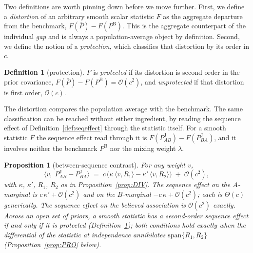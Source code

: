 \documentclass[a4paper,fleqn]{cas-sc}
\newtheorem{proposition}{Proposition}
\theoremstyle{remark}
\theoremstyle{definition}
\newtheorem{definition}{Definition}
\newcommand{\PB}{P^{\mathrm{B}}}
\newcommand{\PJ}{P^{\mathrm{J}}}
\newcommand{\Pbar}{\overline{P}}
\newcommand{\bigO}{\mathcal{O}}
\begin{document}
Two definitions are worth pinning down before we move further. First, we define a \emph{distortion} of an arbitrary smooth scalar statistic $F$ as the aggregate departure from the benchmark, $F(\Pbar)-F(\PB)$. This is the aggregate counterpart of the individual \emph{gap} and is always a population-average object by definition. Second, we define the notion of a \emph{protection}, which classifies that distortion by its order in $c$.

\begin{definition}[protection]\label{def:protection}
$F$ is \emph{protected} if its distortion is second order in the prior covariance,
$F(\Pbar)-F(\PB)=\bigO(c^{2})$, and \emph{unprotected} if that distortion is first order, $\bigO(c)$.
\end{definition}

The distortion compares the population average with the benchmark. The same
classification can be reached without either ingredient, by reading the sequence
effect of Definition~\ref{def:seqeffect} through the statistic itself. For a smooth
statistic $F$ the sequence effect read through it is $F(\PJ_{AB})-F(\PJ_{BA})$, and
it involves neither the benchmark $\PB$ nor the mixing weight $\lambda$.
\par
\renewcommand{\theproposition}{ORD}%
\begin{proposition}[between-sequence contrast]\label{prop:ORD}
For any weight $v$,
\[
\langle v,\;\PJ_{AB}-\PJ_{BA}\rangle
   \;=\; c\,\bigl(\kappa\,\langle v,R_1\rangle-\kappa'\,\langle v,R_2\rangle\bigr)
   \;+\;\bigO(c^{2}),
\]
with $\kappa$, $\kappa'$, $R_1$, $R_2$ as in Proposition~\ref{prop:DIV}. The
sequence effect on the $A$-marginal is $c\,\kappa'+\bigO(c^{2})$ and on the
$B$-marginal $-c\,\kappa+\bigO(c^{2})$; each is $\Theta(c)$ generically. The
sequence effect on the believed association is $\bigO(c^{2})$ exactly. Across an
open set of priors, a smooth statistic has a second-order sequence effect if and
only if it is protected (Definition~\ref{def:protection}); both conditions hold
exactly when the differential of the statistic at independence annihilates
$\mathrm{span}\{R_1,R_2\}$ (Proposition~\ref{prop:PRO} below).
\end{proposition}
\par
\end{document}
